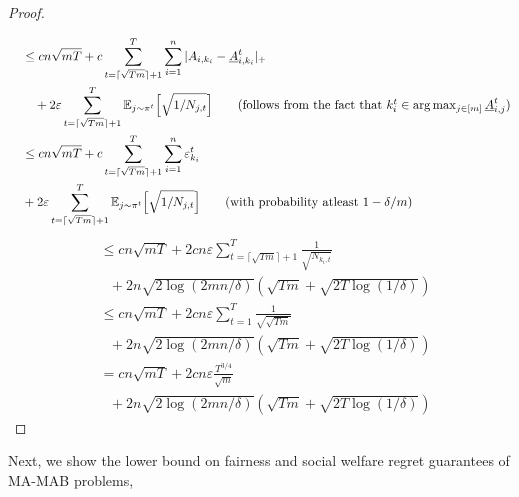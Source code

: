 \begin{proof}
\begin{align*}
\end{align*}
\begin{align*}
& \leq cn\sqrt{mT} + c  \sum_{t= \lceil \sqrt{T m} \rceil +1 }^T \sum_{i=1}^n |A_{i, k_i} - \underline{A}_{i, k_i}^t|_{+}  \\ & \ \ \ +  2 \varepsilon \sum_{t=\lceil \sqrt{T m} \rceil +1}^T \mathbb{E}_{j \sim \pi^t} \Big [\sqrt{1/N_{j,t}} \Big ] %
\tag{follows from the fact that $k_i^t \in \arg\max_{j \in [m]} \underline{A}_{i,j}^t$} \\ 
& \leq cn \sqrt{mT} + c  \sum_{t=\lceil \sqrt{T m} \rceil + 1}^T \sum_{i=1}^n \varepsilon_{k_i}^t \\ \ \ \ & +  2 \varepsilon \sum_{t=\lceil \sqrt{T m} \rceil +1}^T \mathbb{E}_{j \sim \pi^t} \Big [\sqrt{1/N_{j,t}} \Big ] \tag{with probability atleast $1- \delta/m$}\\
\end{align*}
\begin{align*}
& \leq   cn \sqrt{mT }  + 2 c n \varepsilon  \sum_{t=  \lceil \sqrt{T m} \rceil + 1 }^T \frac{1}{\sqrt{N_{k_i, t}}}  \\ & \ \ \ +  2n \sqrt{2 \log(2mn/\delta)}  ( \sqrt{T m} + \sqrt{2T\log(1/\delta)})\\
& \leq   cn \sqrt{mT }  + 2 c n \varepsilon  \sum_{t=  1}^T \frac{1}{\sqrt{ \sqrt{T m} }}  \\ & \ \ \ +  2n \sqrt{2 \log(2mn/\delta)}  ( \sqrt{T m} + \sqrt{2T\log(1/\delta)})\\
& =   cn \sqrt{mT }  + 2 c n \varepsilon  \frac{T^{3/4}}{\sqrt{ m }}  \\ & \ \ \  +  2n \sqrt{2 \log(2mn/\delta)}  ( \sqrt{T m} + \sqrt{2T\log(1/\delta)})
\end{align*} 
\end{proof}
\fi 
{}
Next, we show the lower bound on fairness and social welfare regret guarantees of  MA-MAB problems, 

